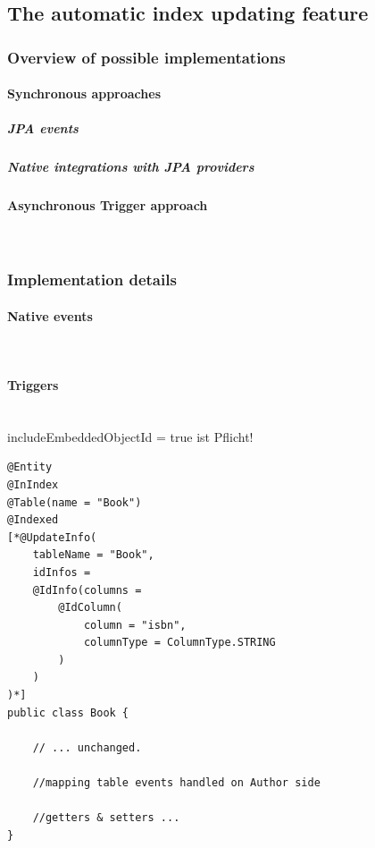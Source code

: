 \subsection{The automatic index updating feature}

\subsubsection{Overview of possible implementations}

\paragraph{Synchronous approaches}

\subparagraph{JPA events}

\subparagraph{Native integrations with JPA providers}

\paragraph{Asynchronous Trigger approach}
~\\



\subsubsection{Implementation details}

\paragraph{Native events}
~\\

\paragraph{Triggers}
~\\

includeEmbeddedObjectId = true ist Pflicht!

\lstset{language=java}
\begin{lstlisting}[frame=htrbl, caption={Book.java with Hibernate Search annotations}, label={lst:book.java_3}]
@Entity
@InIndex
@Table(name = "Book")
@Indexed
[*@UpdateInfo(
	tableName = "Book", 
	idInfos = 
	@IdInfo(columns = 
		@IdColumn(
			column = "isbn", 
			columnType = ColumnType.STRING
		)
	)
)*]
public class Book {

	// ... unchanged. 
	
	//mapping table events handled on Author side
	
	//getters & setters ...
}
\end{lstlisting}

